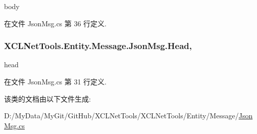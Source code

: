 body 



在文件 Json\-Msg.\-cs 第 36 行定义.

\hypertarget{class_x_c_l_net_tools_1_1_entity_1_1_message_1_1_json_msg_a563af2b66f8c22c04ff557cfe34f2479}{
\subsubsection[{Head}]{ X\-C\-L\-Net\-Tools.\-Entity.\-Message.\-Json\-Msg.\-Head\hspace{0.3cm}{\ttfamily [get]}, {\ttfamily [set]}}}\label{class_x_c_l_net_tools_1_1_entity_1_1_message_1_1_json_msg_a563af2b66f8c22c04ff557cfe34f2479}


head 



在文件 Json\-Msg.\-cs 第 31 行定义.



该类的文档由以下文件生成\-:\begin{DoxyCompactItemize}
\item 
D\-:/\-My\-Data/\-My\-Git/\-Git\-Hub/\-X\-C\-L\-Net\-Tools/\-X\-C\-L\-Net\-Tools/\-Entity/\-Message/\hyperlink{_json_msg_8cs}{Json\-Msg.\-cs}\end{DoxyCompactItemize}
